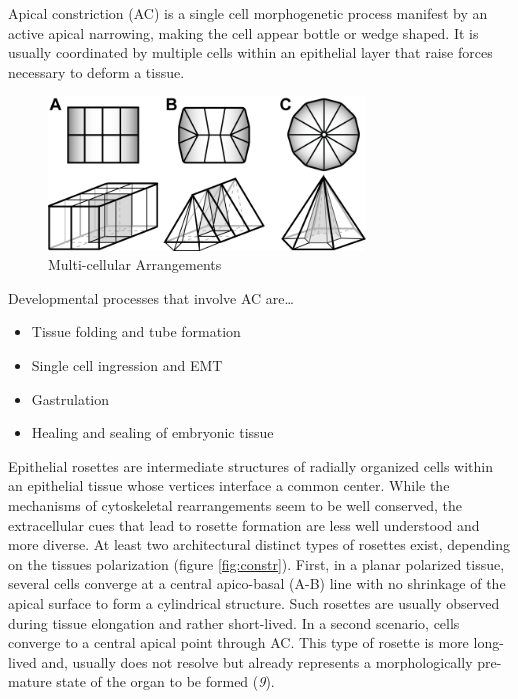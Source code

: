 \documentclass[11pt,singlespacinge,twoside]{reedthesis} %
\providecommand{\tightlist}{%
  \setlength{\itemsep}{0pt}\setlength{\parskip}{0pt}}
\begin{document}
Apical constriction (AC) is a single cell morphogenetic process manifest by an active apical narrowing, making the cell appear bottle or wedge shaped. It is usually coordinated by multiple cells within an epithelial layer that raise forces necessary to deform a tissue.
\begin{figure}

{\centering \includegraphics[width=0.75\textwidth]{figures/intro/arrangements} 

}

\caption{Multi-cellular Arrangements}\label{fig:arrange}
\end{figure}
Developmental processes that involve AC are\ldots{}
\begin{itemize}
\tightlist
\item
  Tissue folding and tube formation
\item
  Single cell ingression and EMT
\item
  Gastrulation
\item
  Healing and sealing of embryonic tissue
\end{itemize}
Epithelial rosettes are intermediate structures of radially organized cells within an epithelial tissue whose vertices interface a common center. While the mechanisms of cytoskeletal rearrangements seem to be well conserved, the extracellular cues that lead to rosette formation are less well understood and more diverse.
At least two architectural distinct types of rosettes exist, depending on the tissues polarization (figure \ref{fig:constr}). First, in a planar polarized tissue, several cells converge at a central apico-basal (A-B) line with no shrinkage of the apical surface to form a cylindrical structure. Such rosettes are usually observed during tissue elongation and rather short-lived. In a second scenario, cells converge to a central apical point through AC. This type of rosette is more long-lived and, usually does not resolve but already represents a morphologically pre-mature state of the organ to be formed (\emph{9}).
\end{document}
